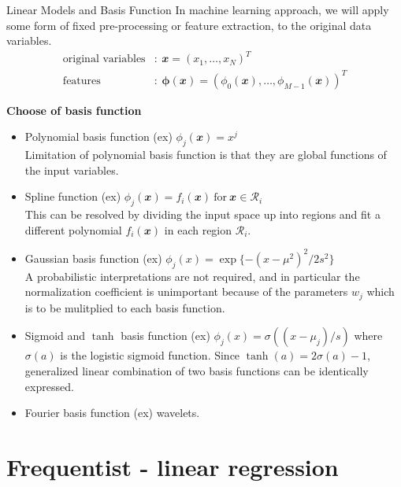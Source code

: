 \documentclass{bredelebeamer}
\begin{document}
\begin{frame}{Linear Models and Basis Function}
  In machine learning approach, we will apply some form of fixed pre-processing
  or feature extraction, to the original data variables.
  \begin{equation}
    \begin{split}
      \textrm{original\ variables}&:\:\mathbfit{x} = {(x_1, \ldots, x_N)}^{T} \\
      \textrm{features}&:\:\boldsymbol{\phi} (\mathbfit{x}) = {(\phi_{0} (\mathbfit{x}), \ldots, \phi_{M-1} (\mathbfit{x}))}^T
    \end{split}
  \end{equation}

  \textbf{Choose of basis function} \\
  \begin{itemize}
    \item Polynomial basis function
          \textrm{(ex)} $\phi_{j} (\mathbfit{x})=x^j$ \\
          Limitation of polynomial basis function is that they are global functions
          of the input variables.
    \item Spline function
          \textrm{(ex)} $\phi_{j} (\mathbfit{x})=f_i (\mathbfit{x})
          \ \textrm{for}\ \mathbfit{x} \in \mathcal{R}_i$ \\
          This can be resolved by dividing the input space up into regions and
          fit a different polynomial $f_i (\mathbfit{x})$ in each region
          $\mathcal{R}_i$.
    \item Gaussian basis function
          \textrm{(ex)} $\phi_{j} (x) = \exp \{ -{(x-\mu^2)}^2 / 2s^2 \}$ \\
          A probabilistic interpretations are not required, and in particular
          the normalization coefficient is unimportant because of the parameters
          $w_j$ which is to be mulitplied to each basis function.
    \item Sigmoid and $\tanh$ basis function
          \textrm{(ex)} $\phi_{j} (x) = \sigma((x-\mu_j) / s)$
          where $\sigma(a)$ is the logistic sigmoid function.
          Since $\tanh(a) = 2\sigma(a) - 1$, generalized linear combination of
          two basis functions can be identically expressed.
    \item Fourier basis function \textrm{(ex)} wavelets.
  \end{itemize}
\end{frame}

\section{Frequentist - linear regression}
\end{document}
